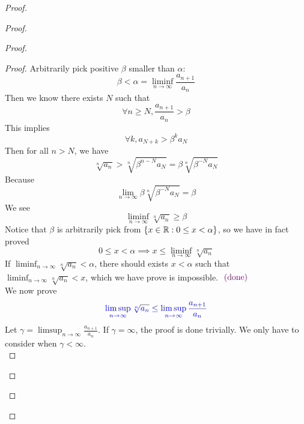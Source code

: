 \documentclass{report}
\begin{document}
\begin{proof}
\begin{proof}
\begin{proof}
\begin{proof}
Arbitrarily pick positive $\beta $ smaller than $\alpha $:
\begin{equation}
\beta <\alpha=\liminf_{n\to\infty} \frac{a_{n+1}}{a_n}
\end{equation}
Then we know there exists $N$ such that
 \begin{equation}
\forall n\geq N, \frac{a_{n+1}}{a_n}>\beta 
\end{equation}
This implies 
\begin{equation}
\forall k, a_{N+k}>\beta^k a_N
\end{equation}
Then for all $n>N$, we have
 \begin{equation}
   \sqrt[n]{a_n}>\sqrt[n]{ \beta^{n-N}a_{N}}=\beta \sqrt[n]{\beta^{-N}a_N} 
\end{equation}
Because 
\begin{equation}
\lim_{n\to\infty}\beta \sqrt[n]{\beta^{-N}a_N}=\beta 
\end{equation}
We see
\begin{equation}
\liminf_{n\to\infty} \sqrt[n]{a_n} \geq \beta 
\end{equation} 
Notice that $\beta $ is arbitrarily pick from $\{ x\in\mathbb{R}: 0\leq x<\alpha  \}$, so we have in fact proved
\begin{equation}
0\leq x<\alpha \implies x\leq \liminf_{n\to\infty} \sqrt[n]{a_n} 
\end{equation}
If $\liminf_{n\to\infty} \sqrt[n]{a_n} <\alpha $, there should exists $x<\alpha $ such that $\liminf_{n\to\infty} \sqrt[n]{a_n} <x$, which we have prove is impossible. $\textcolor{violet}{\text{ (done) }}$\\

We now prove 
\begin{equation}
\textcolor{blue}{\limsup_{n\to\infty} \sqrt[n]{a_n}\leq \limsup_{n\to\infty} \frac{a_{n+1}}{a_n}}
\end{equation}
Let $\gamma =\limsup_{n\to\infty} \frac{a_{n+1}}{a_n}$.  If $\gamma =\infty$, the proof is done trivially. We only have to consider when $\gamma<\infty$.\\


\end{proof}
\end{proof}
\end{proof}
\end{proof}
\end{document}
